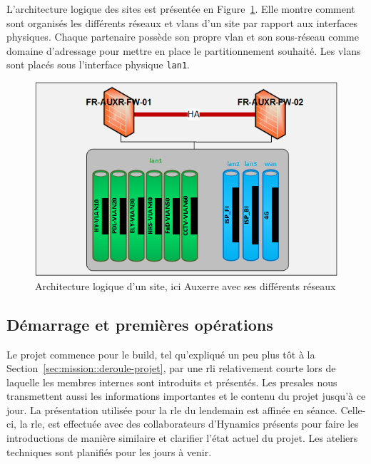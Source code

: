 \documentclass[12pt, oneside, a4paper, titlepage]{report}
\begin{document}
L'architecture logique des sites est présentée en
Figure~\ref{fig:doc-hy/site-logi-arch}. Elle montre comment sont organisés les
différents réseaux et \glspl{vlan} d'un site par rapport aux interfaces
physiques. Chaque partenaire possède son propre \gls{vlan} et son sous-réseau
comme domaine d'adressage pour mettre en place le partitionnement souhaité. Les
\glspl{vlan} sont placés sous l'interface physique \texttt{lan1}.

\begin{figure}[h!]
    \centering
    \includegraphics[width = 0.8\linewidth]{img/doc-hy/site-logi-arch.png}
    \caption{%
        Architecture logique d'un site, ici Auxerre avec ses différents réseaux%
    }%
    \label{fig:doc-hy/site-logi-arch}
\end{figure}

\subsection{Démarrage et premières opérations}%
\label{sub:mission::main::start}

Le projet commence pour le \gls{build}, tel qu'expliqué un peu plus tôt à la
Section~\ref{sec:mission::deroule-projet}, par une \acrfull{rli} relativement
courte lors de laquelle les membres internes sont introduits et présentés. Les
\gls{presales} nous transmettent aussi les informations importantes et le
contenu du projet jusqu'à ce jour. La présentation utilisée pour la \gls{rle} du
lendemain est affinée en séance. Celle-ci, la \acrfull{rle}, est effectuée avec
des collaborateurs d'Hynamics présents pour faire les introductions de manière
similaire et clarifier l'état actuel du projet. Les ateliers techniques sont
planifiés pour les jours à venir.
\end{document}
